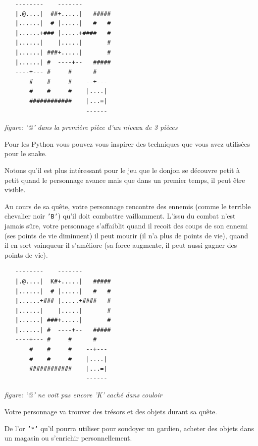 \documentclass{article}
\begin{document}
\begin{verbatim}
   --------    -------
   |.@....|  ##+.....|   #####
   |......|  # |.....|   #   #
   |......+### |.....+####   #
   |......|    |.....|       #
   |......| ###+.....|       #
   |......| #  ----+--   #####
   ----+--- #     #      #
       #    #     #    --+---
       #    #     #    |....|
       ############    |...=|
                       ------
\end{verbatim}
\begin{center}
  \textit{figure: '@' dans la première pièce d'un niveau de 3 pièces}
\end{center}

Pour les Python vous pouvez vous inspirer des techniques que vous avez
utilisées pour le snake.

Notons qu'il est plus intéressant pour le jeu que le donjon se
découvre petit à petit quand le personnage avance mais que dans un
premier temps, il peut être visible.
 
\vspace{.3cm}

Au cours de sa quête, votre personnage rencontre des ennemis (comme le
terrible chevalier noir \texttt{'B'}) qu'il doit combattre
vaillamment. L'issu du combat n'est jamais sûre, votre personnage
s'affaiblit quand il recoit des coups de son ennemi (ses points de vie
diminuent) il peut mourir (il n'a plus de points de vie), quand il en
sort vainqueur il s'améliore (sa force augmente, il peut aussi gagner
des points de vie).


\begin{verbatim}
   --------    -------
   |.@....|  K#+.....|   #####
   |......|  # |.....|   #   #
   |......+### |.....+####   #
   |......|    |.....|       #
   |......| ###+.....|       #
   |......| #  ----+--   #####
   ----+--- #     #      #
       #    #     #    --+---
       #    #     #    |....|
       ############    |...=|
                       ------
\end{verbatim}
\begin{center}
  \textit{figure: '@' ne voit pas encore 'K' caché dans couloir}
\end{center}

\vspace{.3cm}

Votre personnage va trouver des trésors et des objets durant sa quête.

De l'or \texttt{'*'} qu'il pourra utiliser pour soudoyer un gardien,
acheter des objets dans un magasin ou s'enrichir personnellement.
\end{document}
